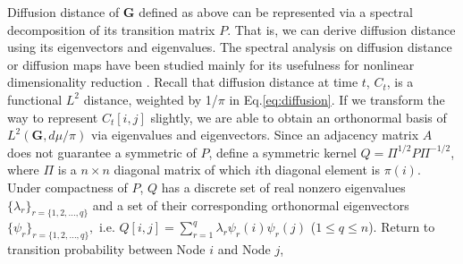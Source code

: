 \documentclass[12pt]{article}
\theoremstyle{definition}
\begin{document}
Diffusion distance of $\boldsymbol{G}$ defined as above can be represented via a spectral decomposition of its transition matrix $P$. That is, we can derive diffusion distance using its eigenvectors and eigenvalues. The spectral analysis on diffusion distance or diffusion maps have been studied mainly for its usefulness for nonlinear dimensionality reduction \citep{coifman2006diffusion,lafon2006diffusion}. 
Recall that diffusion distance at time $t$, $C_{t}$, is a functional $L^2$ distance, weighted by 1/$\pi$ in Eq.\ref{eq:diffusion}. If we transform the way to represent $C_{t}[i,j]$ slightly, we are able to obtain an orthonormal basis of $L^{2}(\mathbf{G}, d\mu / \pi)$ via eigenvalues and eigenvectors. 
Since an adjacency matrix $A$ does not guarantee a symmetric of $P$, define a symmetric kernel $Q = \Pi^{1/2} P \Pi^{-1/2}$, where $\Pi$ is a $n \times n$ diagonal matrix of which $i$th diagonal element is $\pi(i)$. Under compactness of $P$, $Q$ has a discrete set of real nonzero eigenvalues $\{ \lambda_{r} \}_{r = \{1,2,...,q \}}$ and a set of their corresponding orthonormal eigenvectors $\{ \psi_{r} \}_{r = \{1,2,..., q \} },$ i.e. $Q[i,j] = \sum\limits_{r=1}^{q} \lambda_{r} \psi_{r}(i) \psi_{r}(j)$ ($1 \leq q \leq n$).  Return to transition probability between Node $i$ and Node $j$,
\end{document}
